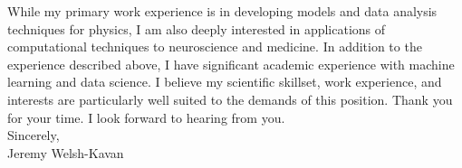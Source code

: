 \documentclass[]{letter}
\begin{document}
While my primary work experience is in developing models and data analysis techniques for physics, I am also deeply interested in applications of computational techniques to neuroscience and medicine. In addition to the experience described above, I have significant academic experience with machine learning and data science. I believe my scientific skillset, work experience, and interests are particularly well suited to the demands of this position. Thank you for your time. I look forward to hearing from you. \\

Sincerely, \\
Jeremy Welsh-Kavan
\end{document}
